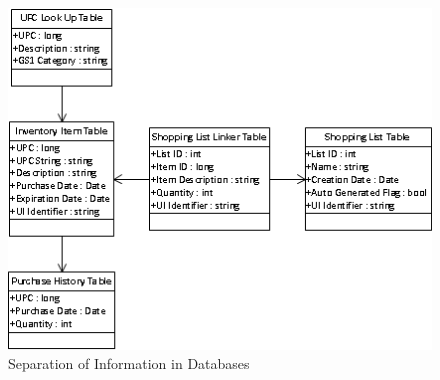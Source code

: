 \documentclass[11pt]{article} %
\begin{document}
\begin{figure}[h!]
\vspace{0.5cm}
\begin{center}
\includegraphics[scale=0.7]{../Graphics/Databases}
\caption{Separation of Information in Databases}
\label{fig:databases}
\end{center}
\end{figure}
\end{document}
